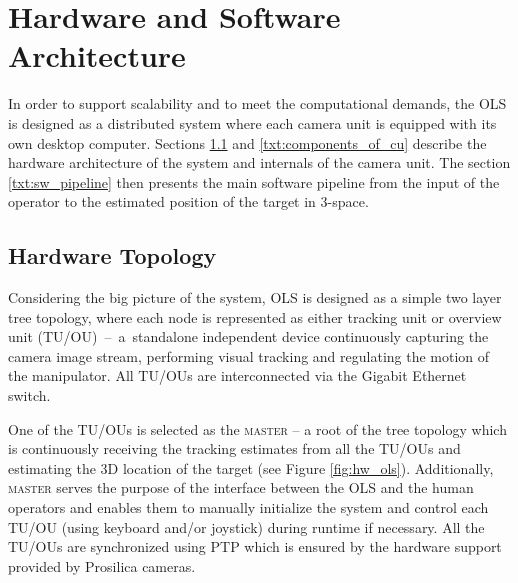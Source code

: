 \section{Hardware and Software Architecture} \label{txt:hw_and_sw_architecture}

In order to support scalability and to meet the computational demands, the OLS is designed as a distributed system where each camera unit is equipped with its own desktop computer. Sections \ref{txt:hardware_topology} and \ref{txt:components_of_cu} describe the hardware architecture of the system and internals of the camera unit. The section \ref{txt:sw_pipeline} then presents the main software pipeline from the input of the operator to the estimated position of the target in 3-space.

\subsection{Hardware Topology} \label{txt:hardware_topology}

Considering the big picture of the system, OLS is designed as a simple two layer tree topology, where each node is represented as either tracking unit or overview unit (TU/OU)~--~a~standalone independent device continuously capturing the camera image stream, performing visual tracking and regulating the motion of the manipulator. All TU/OUs are interconnected via the Gigabit Ethernet switch. 

One of the TU/OUs is selected as the \textsc{master} -- a root of the tree topology which is continuously receiving the tracking estimates from all the TU/OUs and estimating the 3D location of the target (see Figure \ref{fig:hw_ols}). Additionally, \textsc{master} serves the purpose of the interface between the OLS and the human operators and enables them to manually initialize the system and control each TU/OU (using keyboard and/or joystick) during runtime if necessary. All the TU/OUs are synchronized using PTP which is ensured by the hardware support provided by Prosilica cameras.


